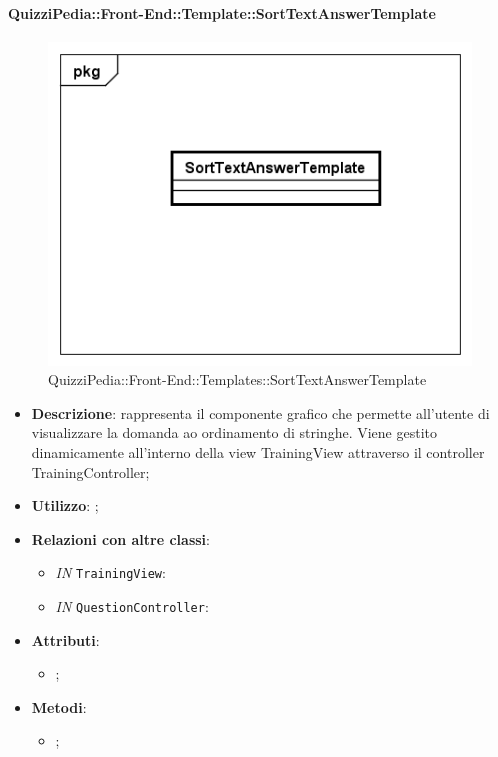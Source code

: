 		\paragraph{QuizziPedia::Front-End::Template::SortTextAnswerTemplate}
		
		\label{QuizziPedia::Front-End::Templates::SortTextAnswerTemplate}
		
		\begin{figure}[h]
			\centering
			\includegraphics[scale=0.5,keepaspectratio]{UML/Classi/Front-End/QuizziPedia_Front-end_Templates_SortTextAnswerTemplate.png}
			\caption{QuizziPedia::Front-End::Templates::SortTextAnswerTemplate}
		\end{figure}
		
		\begin{itemize}
			\item \textbf{Descrizione}: rappresenta il componente grafico che permette all'utente di visualizzare la domanda ao ordinamento di stringhe. Viene gestito dinamicamente all'interno della view TrainingView attraverso il controller TrainingController;
			\item \textbf{Utilizzo}: ;
			\item \textbf{Relazioni con altre classi}: 
			\begin{itemize}
				\item \textit{IN} \texttt{TrainingView}: 
				\item \textit{IN} \texttt{QuestionController}:
			\end{itemize}
			\item \textbf{Attributi}: 
			\begin{itemize}
				\item ;
			\end{itemize}
			\item \textbf{Metodi}: 
			\begin{itemize}
				\item ;
			\end{itemize}
		\end{itemize}
		
